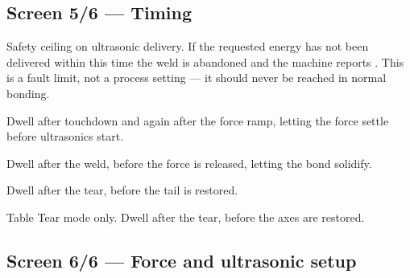 
\subsection*{Screen 5/6 --- Timing}


\begin{description}[leftmargin=!,labelwidth=26mm,style=nextline,font=\normalfont\ttfamily]
\item[Bond Timeout] Safety ceiling on ultrasonic delivery. If the requested
  energy has not been delivered within this time the weld is abandoned and the
  machine reports . This is a fault limit, not a
  process setting --- it should never be reached in normal bonding.
\item[Contact Stl] Dwell after touchdown and again after the force ramp,
  letting the force settle before ultrasonics start.
\item[Cooling] Dwell after the weld, before the force is released, letting the
  bond solidify.
\item[Tail Delay] Dwell after the tear, before the tail is restored.
\item[Tear Stabil] Table Tear mode only. Dwell after the tear, before the axes
  are restored.
\end{description}


\subsection*{Screen 6/6 --- Force and ultrasonic setup}


